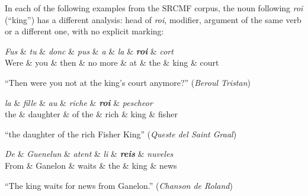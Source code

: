 In each of the following examples from the SRCMF corpus, the noun following \emph{roi} (\enquote{king}) has a different analysis: head of \emph{roi}, modifier, argument of the same verb or a different one, with no explicit marking:

\begin{center}
    \begin{dependency}[theme=simple]
        \begin{deptext}[row 2/.style={font=\small}]
            \textit{Fus} \& \textit{tu} \& \textit{donc} \& \textit{pus} \& \textit{a} \& \textit{la} \& \textbf{\textit{roi}} \& \textit{cort} \\
            Were \& you \& then \& no more \& at \& the \& king \& court \\
        \end{deptext}
    \end{dependency}

    \raggedright
    \enquote{Then were you not at the king's court anymore?} (\emph{Beroul Tristan})
\end{center}

\begin{center}
    \begin{dependency}[theme=simple]
        \begin{deptext}[row 2/.style={font=\small}]
            \textit{la} \& \textit{fille} \& \textit{au} \& \textit{riche} \& \textbf{\textit{roi}} \& \textit{pescheor} \\
            the \& daughter \& of the \& rich \& king \& fisher \\
        \end{deptext}
    \end{dependency}
    
    \raggedright
    \enquote{the daughter of the rich Fisher King} (\emph{Queste del Saint Graal})
\end{center}

\begin{center}
    \begin{dependency}[theme=simple]
        \begin{deptext}[row 2/.style={font=\small}]
            \textit{De} \& \textit{Guenelun} \& \textit{atent} \& \textit{li} \& \textbf{\textit{reis}} \& \textit{nuveles} \\
            From \& Ganelon \& waits \& the \& king \& news \\
        \end{deptext}
    \end{dependency}
    
    \raggedright
    \enquote{The king waits for news from Ganelon.} (\emph{Chanson de Roland})
\end{center}

